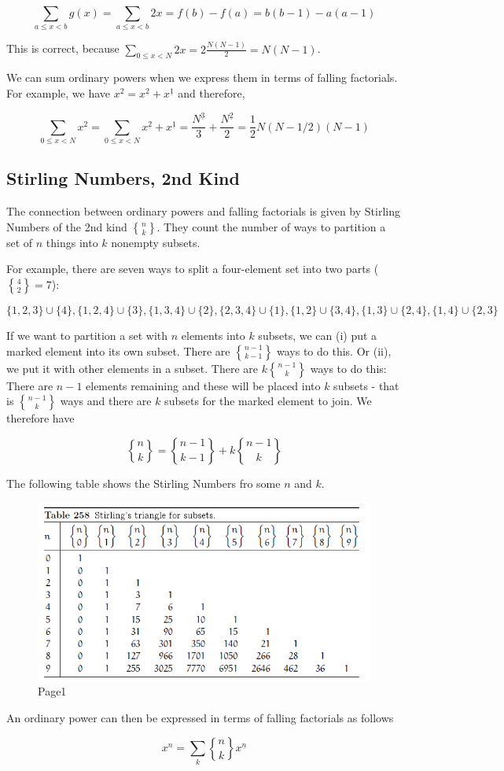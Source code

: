 \[
\sum_{a \leq x < b} g(x) = \sum_{a \leq x < b} 2x = f(b) - f(a) = b(b-1) - a(a-1)
\]

This is correct, because $\sum_{0 \leq x < N} 2x = 2 \frac{N(N-1)}{2} = N(N-1)$.

We can sum ordinary powers when we express them in terms of falling factorials. For example, we have $x^2 = x^{\underline{2}} + x^{\underline{1}}$ and therefore,

\[
\sum_{0 \leq x < N} x^2 = \sum_{0 \leq x < N} x^{\underline{2}} + x^{\underline{1}} = \frac{N^{\underline{3}}}{3} + \frac{N^{\underline{2}}}{2} = \frac{1}{2} N (N-1/2)(N-1)
\]

\subsection{Stirling Numbers, 2nd Kind}

The connection between ordinary powers and falling factorials is given by Stirling Numbers of the 2nd kind ${n \brace k}$. They count the number of ways to partition a set of $n$ things into $k$ nonempty subsets.

For example, there are seven ways to split a four-element set into two parts (${4 \brace 2} = 7$):

\[
\{1,2,3\} \cup \{4\}, \{1,2,4\} \cup \{3\}, \{1,3,4\} \cup \{2\}, \{2,3,4\} \cup \{1\}, \{1,2\} \cup \{3,4\}, \{1,3\} \cup \{2,4\}, \{1,4\} \cup \{2,3\}
\]

If we want to partition a set with $n$ elements into $k$ subsets, we can (i) put a marked element into its own subset. There are ${n-1 \brace k-1}$ ways to do this. Or (ii), we put it with other elements in a subset. There are $k {n-1 \brace k}$ ways to do this: There are $n-1$ elements remaining and these will be placed into $k$ subsets
- that is ${n-1 \brace k}$ ways and there are $k$ subsets for the marked element to join. We therefore have

\begin{equation}
{n \brace k} = {n-1 \brace k-1} + k {n-1 \brace k}
\end{equation}

The following table shows the Stirling Numbers fro some $n$ and $k$.

\begin{figure}[H]
\includegraphics[scale=0.7]{images/stirling_2nd.png}
\caption{Page1}
\end{figure}

An ordinary power can then be expressed in terms of falling factorials as follows

\begin{equation}
x^n = \sum_k {n \brace k} x^{\underline{n}}
\end{equation}
